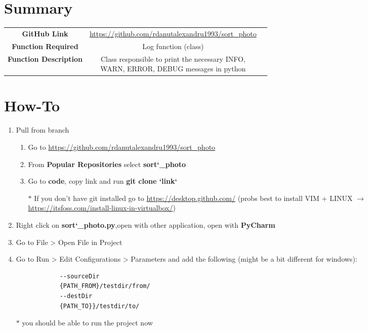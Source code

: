 \documentclass{article}
\begin{document}
\section{Summary}
	\begin{center}
		\begin{tabular}{ | c | c | c }
			\hline
			\textbf{GitHub Link} & \url{https://github.com/rdanutalexandru1993/sort_photo} \\ 
			\textbf{Function Required} & Log function (class)  \\  
			\textbf{Function Description} & \thead{Class responsible to print the necessary INFO,\\ WARN, ERROR, DEBUG messages in python}  \\
			\hline   
		\end{tabular}
	\end{center}

\section{How-To}
	\begin{enumerate}
		\item Pull from branch 
			\begin{enumerate}
				\item Go to \url{https://github.com/rdanutalexandru1993/sort_photo}
				\item From \textbf{Popular Repositories} select \textbf{sort\char`_photo}
				\item Go to \textbf{code}, copy link and run \textbf{git clone \char`{link\char`}}
				\vspace{0.1in}
				\item[$\ast$] If you don't have git installed go to \url{https://desktop.github.com/} (probs best to install VIM + LINUX $\rightarrow$ \url{https://itsfoss.com/install-linux-in-virtualbox/})
			\end{enumerate}
		\item Right click on \textbf{sort\char`_photo.py},open with other application, open with \textbf{PyCharm}
		\item Go to File > Open File in Project
		\item Go to Run > Edit Configurations > Parameters and add the following (might be a bit different for windows): 
		\begin{verbatim}
			--sourceDir
			{PATH_FROM}/testdir/from/
			--destDir
			{PATH_TO}}/testdir/to/
		\end{verbatim}
	\item[$\ast$] you should be able to run the project now
	\end{enumerate}
\end{document}
